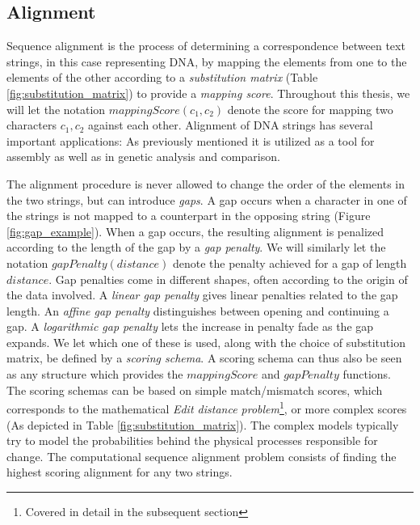 \documentclass[thesis.tex]{subfiles}
\begin{document}
\subsection{Alignment}
\label{sec:alignment}
Sequence alignment is the process of determining a correspondence between text strings, in this case representing DNA, by mapping the elements from one to the elements of the other according to a \textit{substitution matrix} (Table \ref{fig:substitution_matrix}) to provide a \textit{mapping score}. Throughout this thesis, we will let the notation $mappingScore(c_1,c_2)$ denote the score for mapping two characters $c_1, c_2$ against each other. Alignment of DNA strings has several important applications: As previously mentioned it is utilized as a tool for assembly as well as in genetic analysis and comparison.\\
\par\noindent
The alignment procedure is never allowed to change the order of the elements in the two strings, but can introduce \textit{gaps}. A gap occurs when a character in one of the strings is not mapped to a counterpart in the opposing string (Figure \ref{fig:gap_example}). When a gap occurs, the resulting alignment is penalized according to the length of the gap by a \textit{gap penalty}. We will similarly let the notation $gapPenalty(distance)$ denote the penalty achieved for a gap of length $distance$. Gap penalties come in different shapes, often according to the origin of the data involved. A \textit{linear gap penalty} gives linear penalties related to the gap length. An \textit{affine gap penalty} distinguishes between opening and continuing a gap. A \textit{logarithmic gap penalty} lets the increase in penalty fade as the gap expands. We let which one of these is used, along with the choice of substitution matrix, be defined by a \textit{scoring schema}. A scoring schema can thus also be seen as any structure which provides the $mappingScore$ and $gapPenalty$ functions. The scoring schemas can be based on simple match/mismatch scores, which corresponds to the mathematical \textit{Edit distance problem}\footnote{Covered in detail in the subsequent section}, or more complex scores (As depicted in Table \ref{fig:substitution_matrix}). The complex models typically try to model the probabilities behind the physical processes responsible for change. The computational sequence alignment problem consists of finding the highest scoring alignment for any two strings.\\
\par\noindent
\end{document}
